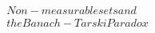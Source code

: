 \documentclass[preview]{standalone}
\begin{document}
\begin{align*}
Non-measurable sets and \\ the Banach-Tarski Paradox
\end{align*}
\end{document}

